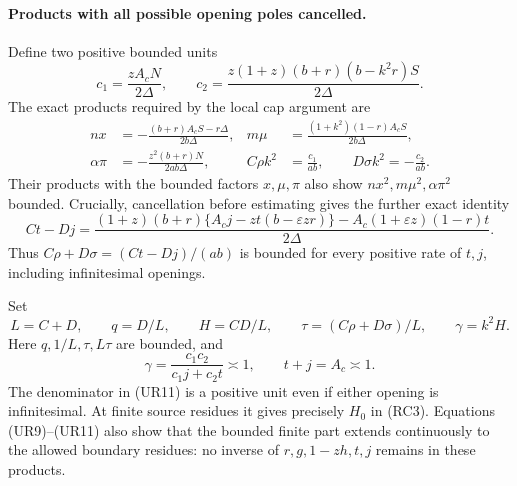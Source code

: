 \paragraph{Products with all possible opening poles cancelled.}
Define two positive bounded units
\[
 c_1=\frac{zA_cN}{2\Delta},\qquad
 c_2=\frac{z(1+z)(b+r)(b-k^2r)S}{2\Delta}.
\]
The exact products required by the local cap argument are
\[
 \begin{aligned}
 nx&=-\frac{(b+r)A_cS-r\Delta}{2b\Delta},&
 m\mu&=\frac{(1+k^2)(1-r)A_cS}{2b\Delta},\\
 \alpha\pi&=-\frac{z^2(b+r)N}{2ab\Delta},&
 C\rho k^2&=\frac{c_1}{ab},\qquad
 D\sigma k^2=-\frac{c_2}{ab}.
 \end{aligned}                                                   \tag{UR9}
 \label{eq:ui-cancelled-products}
\]
Their products with the bounded factors $x,\mu,\pi$ also show
$nx^2,m\mu^2,\alpha\pi^2$ bounded. Crucially, cancellation before
estimating gives the further exact identity
\[
 Ct-Dj=
 \frac{(1+z)(b+r)\{A_cj-zt(b-\varepsilon zr)\}
       -A_c(1+\varepsilon z)(1-r)t}{2\Delta}.          \tag{UR10}
 \label{eq:ui-cancelled-CD-difference}
\]
Thus $C\rho+D\sigma=(Ct-Dj)/(ab)$ is bounded for every positive rate
of $t,j$, including infinitesimal openings.

Set
\[
 L=C+D,\qquad q=D/L,\qquad H=CD/L,\qquad
 \tau=(C\rho+D\sigma)/L,\qquad \gamma=k^2H.
\]
Here $q,1/L,\tau,L\tau$ are bounded, and
\[
 \gamma=\frac{c_1c_2}{c_1j+c_2t}\asymp1,
 \qquad t+j=A_c\asymp1.                              \tag{UR11}
 \label{eq:ui-harmonic-unit}
\]
The denominator in (UR11) is a positive unit even if either opening
is infinitesimal. At finite source residues it gives precisely $H_0$
in (RC3). Equations (UR9)--(UR11) also show that the bounded finite
part extends continuously to the allowed boundary residues: no
inverse of $r,g,1-zh,t,j$ remains in these products.

